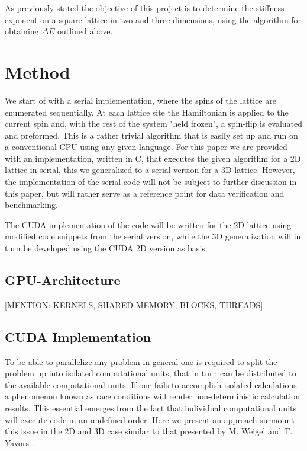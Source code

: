 \documentclass[paper=a4, fontsize=11pt]{scrartcl} %
\numberwithin{equation}{section} %
\numberwithin{figure}{section} %
\numberwithin{table}{section} %
\begin{document}
As previously stated the objective of this project is to determine the stiffness exponent on a square lattice in two and three dimensions, using the algorithm for obtaining $\Delta E$ outlined above.

\section{Method}
\label{sec:method}
We start of with a serial implementation, where the spins of the lattice are enumerated sequentially. At each lattice site the Hamiltonian is applied to the current spin and, with the rest of the system "held frozen", a spin-flip is evaluated and preformed. This is a rather trivial algorithm that is easily set up and run on a conventional CPU using any given language. For this paper we are provided with an implementation, written in C, that executes the given algorithm for a 2D lattice in serial, this we generalized to a serial version for a 3D lattice. However, the implementation of the serial code will not be subject to further discussion in this paper, but will rather serve as a reference point for data verification and benchmarking.

The CUDA implementation of the code will be written for the 2D lattice using modified code snippets from the serial version, while the 3D generalization will in turn be developed using the CUDA 2D version as basis.

\subsection{GPU-Architecture}

[MENTION: KERNELS, SHARED MEMORY, BLOCKS, THREADS]


\subsection{CUDA Implementation}
To be able to parallelize any problem in general one is required to split the problem up into isolated computational units, that in turn can be distributed to the available computational units. If one fails to accomplish isolated calculations a phenomenon known as race conditions will render non-deterministic calculation results. This essential emerges from the fact that individual computational units will execute code in an undefined order. Here we present an approach surmount this issue in the 2D and 3D case similar to that presented by M. Weigel and T. Yavors \cite{gpu_mc_spins}.
\end{document}
